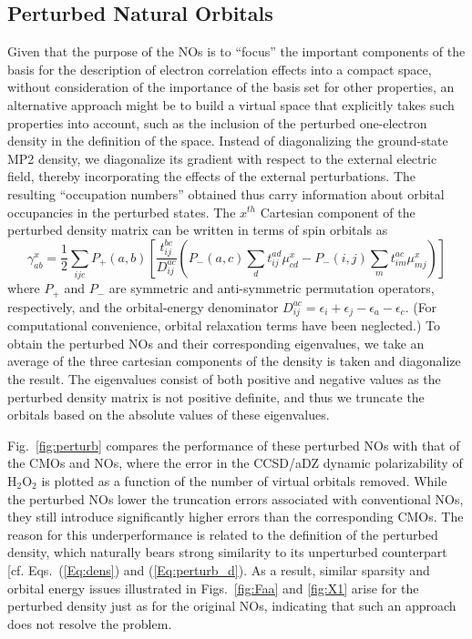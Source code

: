 \documentclass[11pt,article]{achemso}
\begin{document}
\subsection{Perturbed Natural Orbitals}

Given that the purpose of the NOs is to ``focus'' the important components of
the basis for the description of electron correlation effects into a compact
space, without consideration of the importance of the basis set for other
properties, an alternative approach might be to build a virtual space that
explicitly takes such properties into account, such as the inclusion of the
perturbed one-electron density in the definition of the space.  Instead of
diagonalizing the ground-state MP2 density, we diagonalize its gradient with
respect to the external electric field, thereby incorporating the effects of
the external perturbations.  The resulting ``occupation numbers'' obtained
thus carry information about orbital occupancies in the perturbed states.  The
$x^{th}$ Cartesian component of the perturbed density matrix can be written in
terms of spin orbitals as
\begin{equation}
\gamma^x_{ab} = \frac{1}{2}\sum_{ijc}P_{+}(a,b)\left[\frac{t^{bc}_{ij}}{D^{ac}_{ij}}\left(P_{-}(a,c)\sum_dt^{ad}_{ij}\mu^x_{cd} - P_{-}(i,j)\sum_m t^{ac}_{im}\mu^x_{mj}\right)\right]
\label{Eq:perturb_d}
\end{equation}
where $P_{+}$ and $P_{-}$ are symmetric and anti-symmetric permutation
operators, respectively, and the orbital-energy denominator $D^{ac}_{ij} =
\epsilon_i + \epsilon_j  -\epsilon_a -\epsilon_c $.  (For computational
convenience, orbital relaxation terms have been neglected.) To obtain the
perturbed NOs and their corresponding eigenvalues, we take an average of the
three cartesian components of the density is taken and diagonalize the result.
The eigenvalues consist of both positive and negative values as the perturbed
density matrix is not positive definite, and thus we truncate the orbitals
based on the absolute values of these eigenvalues.

Fig.~\ref{fig:perturb} compares the performance of these perturbed NOs with
that of the CMOs and NOs, where the error in the CCSD/aDZ dynamic
polarizability of H$_2$O$_2$ is plotted as a function of the number of virtual
orbitals removed. While the perturbed NOs lower the truncation errors
associated with conventional NOs, they still introduce significantly higher
errors than the corresponding CMOs.  The reason for this underperformance is
related to the definition of the perturbed density, which naturally bears
strong similarity to its unperturbed counterpart [cf. Eqs.~(\ref{Eq:dens}) and
(\ref{Eq:perturb_d}).  As a result, similar sparsity and orbital energy issues
illustrated in Figs.~\ref{fig:Faa} and \ref{fig:X1} arise for the perturbed
density just as for the original NOs, indicating that such an approach does not
resolve the problem.
\end{document}
